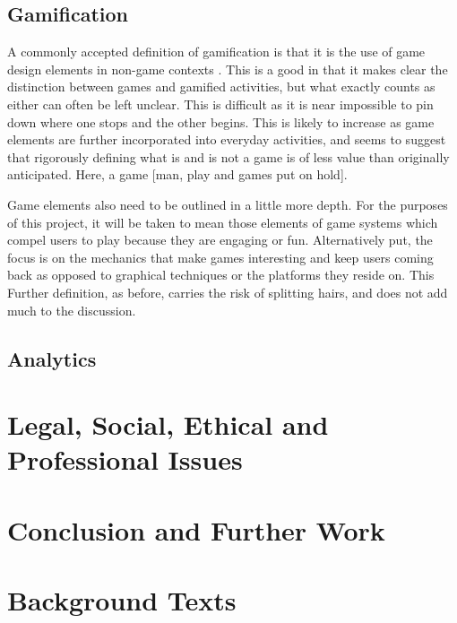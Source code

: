 \documentclass{article}
\begin{document}
\subsection{Gamification}
A commonly accepted definition of gamification is that it is the use of game design elements in non-game contexts \cite{deterding2011game}. This is a good in that it makes clear the distinction between games and gamified activities, but what exactly counts as either can often be left unclear. This is difficult as it is near impossible to pin down where one stops and the other begins. This is likely to increase as game elements are further incorporated into everyday activities, and seems to suggest that rigorously defining what is and is not a game is of less value than originally anticipated. Here, a game [man, play and games put on hold].

Game elements also need to be outlined in a little more depth. For the purposes of this project, it will be taken to mean those elements of game systems which compel users to play because they are engaging or fun. Alternatively put, the focus is on the mechanics that make games interesting and keep users coming back as opposed to graphical techniques or the platforms they reside on. This  Further definition, as before, carries the risk of splitting hairs, and does not add much to the discussion.

\subsection{Analytics}

\section{Legal, Social, Ethical and Professional Issues}

\section{Conclusion and Further Work}

\section{Background Texts}



\end{document}
